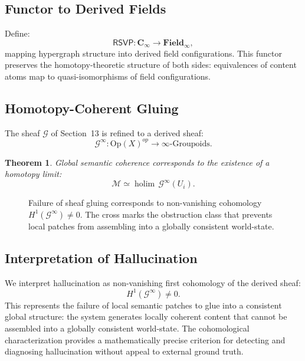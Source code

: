 \documentclass[11pt]{article}
\newtheorem{theorem}{Theorem}[section]
\begin{document}
\subsection{Functor to Derived Fields}

Define:
\[
\mathsf{RSVP} :
\mathbf{C}_\infty \to \mathbf{Field}_\infty,
\]
mapping hypergraph structure into derived field configurations.
This functor preserves the homotopy-theoretic structure of both sides:
equivalences of content atoms map to quasi-isomorphisms of field
configurations.

\subsection{Homotopy-Coherent Gluing}

The sheaf $\mathscr{G}$ of Section~13 is refined to a derived sheaf:
\[
\mathscr{G}^\infty : \mathrm{Op}(X)^{op} \to \infty\text{-Groupoids}.
\]

\begin{theorem}
Global semantic coherence corresponds to the existence of a homotopy
limit:
\[
\mathcal{M} \simeq \operatorname{holim}\, \mathscr{G}^\infty(U_i).
\]
\end{theorem}

\begin{figure}[h]
\centering
{}
\caption{Failure of sheaf gluing corresponds to non-vanishing cohomology
$H^1(\mathscr{G}^\infty) \neq 0$. The cross marks the obstruction class
that prevents local patches from assembling into a globally consistent
world-state.}
\end{figure}

\subsection{Interpretation of Hallucination}

We interpret hallucination as non-vanishing first cohomology of the derived
sheaf:
\[
H^1(\mathscr{G}^\infty) \neq 0.
\]
This represents the failure of local semantic patches to glue into a
consistent global structure: the system generates locally coherent content
that cannot be assembled into a globally consistent world-state.
The cohomological characterization provides a mathematically precise
criterion for detecting and diagnosing hallucination without appeal to
external ground truth.
\end{document}
